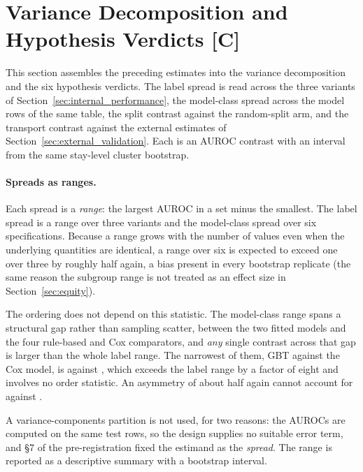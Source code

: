 

\section{Variance Decomposition and Hypothesis Verdicts \texorpdfstring{[C]}{[C]}}
\label{sec:decomposition}

This section assembles the preceding estimates into the variance decomposition
and the six hypothesis verdicts. The label spread is read across the three
variants of Section~\ref{sec:internal_performance}, the model-class spread
across the model rows of the same table, the split contrast against the
random-split arm, and the transport contrast against the external estimates of
Section~\ref{sec:external_validation}. Each is an AUROC contrast with an interval
from the same stay-level cluster bootstrap.

\paragraph{Spreads as ranges.} Each spread is a \emph{range}: the largest AUROC
in a set minus the smallest. The label spread is a range over three variants and
the model-class spread over six specifications. Because a range grows with the
number of values even when the underlying quantities are identical, a range
over six is expected to exceed one over three by roughly half again, a bias
present in every bootstrap replicate (the same reason the subgroup range is not
treated as an effect size in Section~\ref{sec:equity}).

The ordering does not depend on this statistic. The model-class range spans a
structural gap rather than sampling scatter, between the two fitted
models and the four rule-based and Cox comparators, and \emph{any} single
contrast across that gap is larger than the whole label range. The narrowest of
them, GBT against the Cox model, is \pcAurocGbtB{} against \pcAurocCoxB, which
exceeds the label range by a factor of eight and involves no order statistic.
An asymmetry of about half again cannot account for \pcSpreadModelClass{}
against \pcSpreadLabel.

A variance-components partition is not used, for two reasons: the AUROCs are
computed on the same test rows, so the design supplies no suitable error term,
and \S7 of the pre-registration fixed the estimand as the \emph{spread}. The
range is reported as a descriptive summary with a bootstrap interval.

